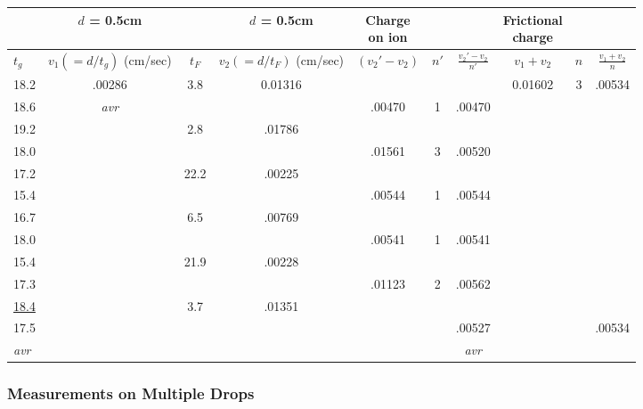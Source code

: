 \begin{center}
\small
\begin{tabular}{|l|c||c|c|c|c|c|c|c|c|}
\hline
 & $d$ = 0.5cm & & $d$ = 0.5cm & \makecell{Charge\\on ion} & & & \makecell{Frictional\\charge} & & \\
\hline
$t_g$ & \makecell{$v_1(=d/t_g)$\\(cm/sec)} & $t_F$ & \makecell{$v_2(=d/t_F)$\\(cm/sec)} & $(v_{2}'\!-\!v_2)$ & $n'$ & $\frac{v_{2}'-v_2}{n'}$ & $v_1+v_2$ & $n$ & $\frac{v_1+v_2}{n}$\\
\hline
18.2    & .00286 & 3.8 & 0.01316 & & & & 0.01602 & 3 & .00534\\
18.6    & \emph{avr}  & & & .00470 & 1 & .00470 & & & \\
19.2    & & 2.8 & .01786 & & & & & & \\
18.0    & & & & .01561 & 3 & .00520 & & & \\
17.2    & & 22.2 & .00225 & & & & & & \\
15.4    & & & & .00544 & 1 & .00544 & & & \\
16.7    & & 6.5 & .00769 & & & & & & \\
18.0    & & & & .00541 & 1 & .00541 & & & \\
15.4    & & 21.9 & .00228 & & & & & & \\
17.3    & & & & .01123 & 2 & .00562 & & & \\
\underline{18.4}    & & 3.7 & .01351 & & & \underline{\hspace{2em}} & & & \underline{\hspace{2em}} \\
17.5 & & & & & & .00527 & & & .00534 \\
\emph{avr} & & & & & & \emph{avr} & & &\\
\hline
\end{tabular}
\end{center}

\subsubsection*{Measurements on Multiple Drops}

